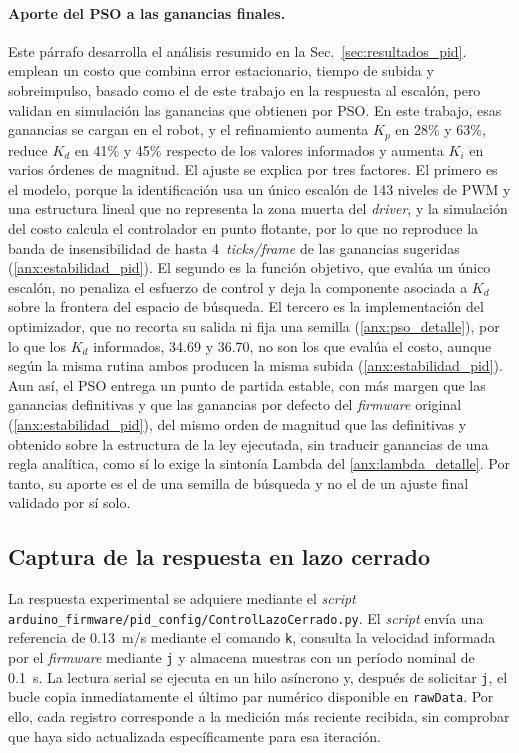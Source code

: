 \begin{appendices}
\paragraph{Aporte del PSO a las ganancias finales.} Este párrafo desarrolla el
análisis resumido en la Sec.~\ref{sec:resultados_pid}.
\citet{gokcce2021particle} emplean un costo que combina error estacionario,
tiempo de subida y sobreimpulso, basado como el de este trabajo en la respuesta
al escalón, pero validan en simulación las ganancias que obtienen por PSO. En
este trabajo, esas
ganancias se cargan en el robot, y el refinamiento aumenta $K_p$ en 28\% y
63\%, reduce $K_d$ en 41\% y 45\% respecto de los valores informados y aumenta
$K_i$ en varios órdenes de magnitud. El ajuste se explica por tres factores. El
primero es el modelo, porque la identificación usa un único escalón de 143
niveles de PWM y una estructura lineal que no representa la zona muerta del
\textit{driver}, y la simulación del costo calcula el controlador en punto
flotante, por lo que no reproduce la banda de insensibilidad de hasta
4~\textit{ticks/frame} de las ganancias sugeridas (\ref{anx:estabilidad_pid}).
El segundo es la función objetivo, que evalúa un único escalón, no penaliza el
esfuerzo de control y deja la componente asociada a $K_d$ sobre la frontera del
espacio de búsqueda. El tercero es la implementación del optimizador, que no
recorta su salida ni fija una semilla (\ref{anx:pso_detalle}), por lo que los
$K_d$ informados, 34.69 y 36.70, no son los que evalúa el costo, aunque según la
misma rutina ambos producen la misma subida (\ref{anx:estabilidad_pid}). Aun
así, el PSO entrega un punto de partida estable, con más margen que las
ganancias definitivas y que las ganancias por defecto del \textit{firmware}
original (\ref{anx:estabilidad_pid}), del mismo orden de magnitud que las
definitivas y obtenido sobre la estructura de la ley ejecutada, sin traducir
ganancias de una regla analítica, como sí lo exige la sintonía Lambda del
\ref{anx:lambda_detalle}. Por tanto, su aporte es el de una semilla de búsqueda
y no el de un ajuste final validado por sí solo.

\subsection{Captura de la respuesta en lazo cerrado}
\label{anx:captura_lazo_cerrado}

La respuesta experimental se adquiere mediante el \textit{script}
\texttt{arduino\_\allowbreak{}firmware/\allowbreak{}pid\_\allowbreak{}config/\allowbreak{}ControlLazoCerrado.\allowbreak{}py}. El \textit{script} envía una referencia de 0.13~m/s
mediante el comando \texttt{k}, consulta la velocidad informada por el
\textit{firmware} mediante \texttt{j} y almacena muestras con un período nominal de
0.1~s. La lectura serial se ejecuta en un hilo asíncrono y, después de solicitar
\texttt{j}, el bucle copia inmediatamente el último par numérico disponible en
\texttt{rawData}. Por ello, cada registro corresponde a la medición más reciente
recibida, sin comprobar que haya sido actualizada específicamente para esa
iteración.


\end{appendices}

